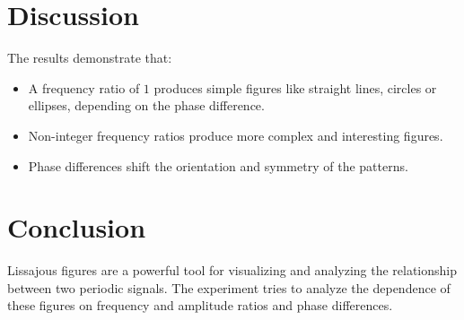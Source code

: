 \documentclass[12pt]{article}
\begin{document}
\section{Discussion}
The results demonstrate that:
\begin{itemize}
    \item A frequency ratio of $1$ produces simple figures like straight lines, circles or ellipses, depending on the phase difference.
    \item Non-integer frequency ratios produce more complex and interesting figures.
    \item Phase differences shift the orientation and symmetry of the patterns.
\end{itemize}

\section{Conclusion}
Lissajous figures are a powerful tool for visualizing and analyzing the relationship between two periodic signals. The experiment tries to analyze the dependence of these figures on frequency and amplitude ratios and phase differences.
\end{document}
